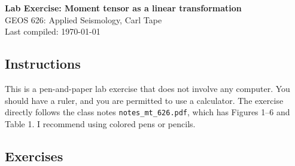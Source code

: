 \documentclass[11pt,titlepage,fleqn]{article}
\newcommand{\mtfile}{\texttt{notes\_mt\_626.pdf}}
\begin{document}

\begin{spacing}{1.2}
\centering
{\large \bf Lab Exercise: Moment tensor as a linear transformation} \\
GEOS 626: Applied Seismology, Carl Tape \\
Last compiled: \today
\end{spacing}

\setcounter{figure}{6}
\setcounter{table}{1}

\subsection*{Instructions}

This is a pen-and-paper lab exercise that does not involve any computer. You should have a ruler, and you are permitted to use a calculator. The exercise directly follows the class notes \mtfile, which has Figures 1--6 and Table 1. I recommend using colored pens or pencils.


\subsection*{Exercises}
\end{document}
